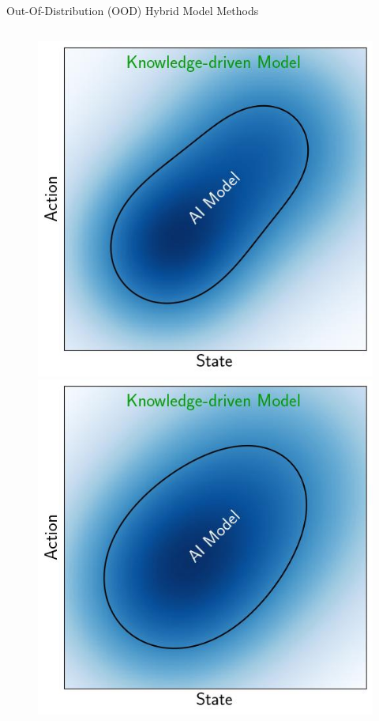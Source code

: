 \documentclass[lecture]{beamer}
\begin{document}
\begin{frame}{\normalsize Out-Of-Distribution (OOD) Hybrid Model Methods}
\begin{columns}
\begin{overlayarea}{\textwidth}{0.5\textheight}
\begin{figure}
{        }
        {%
         \includegraphics[width=\FS\textwidth,clip]{Codes/Epistemic/Hybrid2.jpeg}
        }
        {%
         \includegraphics[width=\FS\textwidth,clip]{Codes/Epistemic/Hybrid1.jpeg}
}
\end{figure}
\end{overlayarea}
\end{columns}
\end{frame}
\end{document}
